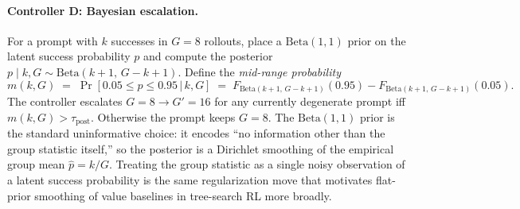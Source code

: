 \paragraph{Controller D: Bayesian escalation.}
For a prompt with $k$ successes in $G{=}8$ rollouts, place a
$\mathrm{Beta}(1,1)$ prior on the latent success probability $p$ and
compute the posterior
$p \mid k, G \sim \mathrm{Beta}(k{+}1,\, G{-}k{+}1)$. Define the
\emph{mid-range probability}
\begin{equation}
m(k, G) \;=\; \Pr\!\left[0.05 \le p \le 0.95 \,\big|\, k, G\right]
\;=\; F_{\mathrm{Beta}(k+1,\, G-k+1)}(0.95) - F_{\mathrm{Beta}(k+1,\, G-k+1)}(0.05).
\label{eq:zvf-midrange}
\end{equation}
The controller escalates $G{=}8 \to G'{=}16$ for any currently
degenerate prompt iff $m(k, G) > \tau_{\mathrm{post}}$. Otherwise the
prompt keeps $G{=}8$. The $\mathrm{Beta}(1,1)$ prior is the standard
uninformative choice: it encodes ``no information other than the
group statistic itself,'' so the posterior is a Dirichlet smoothing
of the empirical group mean $\hat p = k/G$. Treating the group
statistic as a single noisy observation of a latent success
probability is the same regularization move that motivates flat-prior
smoothing of value baselines in tree-search RL more broadly.


